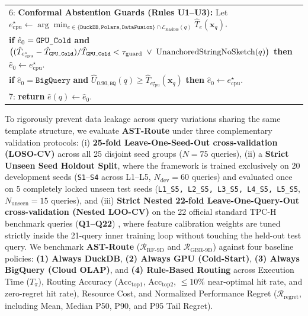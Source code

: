 \documentclass[10pt,a4paper]{article}
\newenvironment{fitasttable}{%
  \begin{lrbox}{\asttblbox}%
}{%
  \end{lrbox}%
  \sbox{\asttblboxB}{%
    \ifdim\wd\asttblbox>0.96\textwidth
      \resizebox{0.96\textwidth}{!}{\usebox{\asttblbox}}%
    \else
      \usebox{\asttblbox}%
    \fi
  }%
  \ifdim\ht\asttblboxB>0.72\textheight
    \resizebox{!}{0.72\textheight}{\usebox{\asttblboxB}}%
  \else
    \usebox{\asttblboxB}%
  \fi
}
\begin{document}
\begin{table}[!t]
\begin{fitasttable}
\begin{tabular}{@{}p{}@{}}
6: \textbf{Conformal Abstention Guards (Rules U1--U3):} Let $e_{\text{cpu}}^\star \leftarrow \arg\min_{e \in \{\texttt{DuckDB},\texttt{Polars},\texttt{DataFusion}\}\cap\mathcal{E}_{\text{feasible}}(q)} \hat{T}_e(\mathbf{x}_q)$. \\
\hspace*{1.2em}\textbf{if} $\hat{e}_0 = \texttt{GPU\_\allowbreak{}Cold}$ \textbf{and} $\big((\hat{T}_{e_{\text{cpu}}^\star} - \hat{T}_{\texttt{GPU\_\allowbreak{}Cold}})/\hat{T}_{\texttt{GPU\_\allowbreak{}Cold}} < \tau_{\text{guard}} \;\vee\; \text{UnanchoredStringNoSketch}(q)\big)$ \textbf{then} $\hat{e}_0 \leftarrow e_{\text{cpu}}^\star$. \\
\hspace*{1.2em}\textbf{if} $\hat{e}_0 = \texttt{BigQuery}$ \textbf{and} $\hat{U}_{0.90,\texttt{BQ}}(q) \ge \hat{T}_{e_{\text{cpu}}^\star}(\mathbf{x}_q)$ \textbf{then} $\hat{e}_0 \leftarrow e_{\text{cpu}}^\star$. \\
7: \textbf{return} $\hat{e}(q) \leftarrow \hat{e}_0$. \\
\bottomrule
\end{tabular}
\end{fitasttable}
\end{table}

To rigorously prevent data leakage across query variations sharing the same template structure, we evaluate \textbf{AST-Route} under three complementary validation protocols: (i) \textbf{25-fold Leave-One-Seed-Out cross-validation (LOSO-CV)} across all 25 disjoint seed groups ($N=75$ queries), (ii) a \textbf{Strict Unseen Seed Holdout Split}, where the framework is trained exclusively on 20 development seeds (\texttt{S1}--\texttt{S4} across L1--L5, $N_{\text{dev}}=60$ queries) and evaluated once on 5 completely locked unseen test seeds (\texttt{L1\_\allowbreak{}S5, L2\_\allowbreak{}S5, L3\_\allowbreak{}S5, L4\_\allowbreak{}S5, L5\_\allowbreak{}S5}, $N_{\text{unseen}}=15$ queries), and (iii) \textbf{Strict Nested 22-fold Leave-One-Query-Out cross-validation (Nested LOO-CV)} on the 22 official standard TPC-H benchmark queries (\textbf{Q1--Q22}) \cite{tpc2022tpch}, where feature calibration weights are tuned strictly inside the 21-query inner training loop without touching the held-out test query. We benchmark \textbf{AST-Route} ($\mathcal{R}_{\text{RF-9D}}$ and $\mathcal{R}_{\text{GBR-9D}}$) against four baseline policies: \textbf{(1) Always DuckDB}, \textbf{(2) Always GPU (Cold-Start)}, \textbf{(3) Always BigQuery (Cloud OLAP)}, and \textbf{(4) Rule-Based Routing} across Execution Time ($T_{\pi}$), Routing Accuracy ($\text{Acc}_{\text{top1}}$, $\text{Acc}_{\text{top2}}$, $\le 10\%$ near-optimal hit rate, and zero-regret hit rate), Resource Cost, and Normalized Performance Regret ($\mathcal{R}_{\text{regret}}$, including Mean, Median P50, P90, and P95 Tail Regret).
\end{document}
